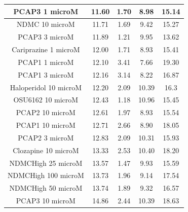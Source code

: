\documentclass[a4paper,12pt]{article}
\begin{document}
\begin{table}[h!]
\begin{tabular}{|c|c|c|c|c|}
PCAP3 1 microM       & 11.60  & 1.70  & 8.98  & 15.14 \\ \hline
NDMC 10 microM         & 11.71 & 1.69 & 9.42  & 15.27 \\ \hline
PCAP3 3 microM       & 11.89 & 1.21 & 9.95  & 13.62 \\ \hline
Cariprazine 1 microM   & 12.00    & 1.71 & 8.93  & 15.41 \\ \hline
PCAP1 1 microM         & 12.10  & 3.41 & 7.66  & 19.30  \\ \hline
PCAP1 3 microM         & 12.16 & 3.14 & 8.22  & 16.87 \\ \hline
Haloperidol 10 microM  & 12.20  & 2.09 & 10.39 & 16.3  \\ \hline
OSU6162 10 microM      & 12.43 & 1.18 & 10.96 & 15.45 \\ \hline
PCAP2 10 microM        & 12.61 & 1.97 & 8.93  & 15.54 \\ \hline
PCAP1 10 microM        & 12.71 & 2.66 & 8.90   & 18.05 \\ \hline
PCAP2 3 microM         & 12.83 & 2.09 & 10.31 & 15.93 \\ \hline
Clozapine 10 microM    & 13.33 & 2.53 & 10.40  & 18.20  \\ \hline
NDMCHigh 25 microM     & 13.57 & 1.47 & 9.93  & 15.59 \\ \hline
NDMCHigh 100 microM    & 13.73 & 1.96 & 9.14  & 17.54 \\ \hline
NDMCHigh 50 microM     & 13.74 & 1.89 & 9.32  & 16.57 \\ \hline
PCAP3 10 microM      & 14.86 & 2.44 & 10.39 & 18.63 \\\hline
\end{tabular}
\end{table}
\newpage
\end{document}
